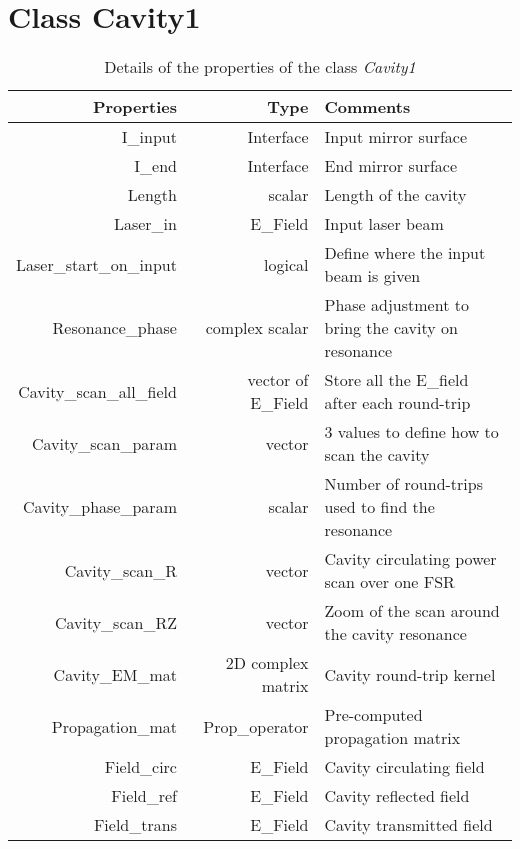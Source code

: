 \section{Class Cavity1}

\begin{table}
  \centering
  \caption{\label{App3:Cavity} Details of the properties of the class \textsl{Cavity1} }
\begin{tabular}{|r r l|}
\hline
{\Large\strut} Properties & Type &  Comments \\
\hline
{\Large\strut} I\_input &  Interface & Input mirror surface \\
{\Large\strut} I\_end &  Interface & End mirror surface \\
{\Large\strut} Length &  scalar & Length of the cavity \\
{\Large\strut} Laser\_in &  E\_Field & Input laser beam \\
{\Large\strut} Laser\_start\_on\_input &  logical  & Define where the input beam is given \\
{\Large\strut} Resonance\_phase &  complex scalar &  Phase adjustment to bring the cavity on resonance \\
{\Large\strut} Cavity\_scan\_all\_field & vector of E\_Field  &  Store all the E\_field after each round-trip \\
{\Large\strut} Cavity\_scan\_param &  vector &  3 values to define how to scan the cavity \\
{\Large\strut} Cavity\_phase\_param &  scalar & Number of round-trips used to find the resonance \\
{\Large\strut} Cavity\_scan\_R &  vector  & Cavity circulating power scan over one FSR \\
{\Large\strut} Cavity\_scan\_RZ &  vector &  Zoom of the scan around the cavity resonance \\
{\Large\strut} Cavity\_EM\_mat &  2D complex matrix &  Cavity round-trip kernel \\
{\Large\strut} Propagation\_mat & Prop\_operator & Pre-computed propagation matrix \\
{\Large\strut} Field\_circ &  E\_Field &  Cavity circulating field \\
{\Large\strut} Field\_ref &  E\_Field & Cavity reflected field  \\
{\Large\strut} Field\_trans &  E\_Field & Cavity transmitted field  \\
\hline
\end{tabular}
\end{table}

